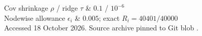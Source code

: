 Cov shrinkage $\rho$ / ridge $\tau$ & $0.1$ / $10^{-6}$\\
Nodewise allowance $\epsilon_i$ & $0.005$; exact $R_i=40401/40000$\\

Accessed 18 October 2026. Source archive pinned to Git blob
.